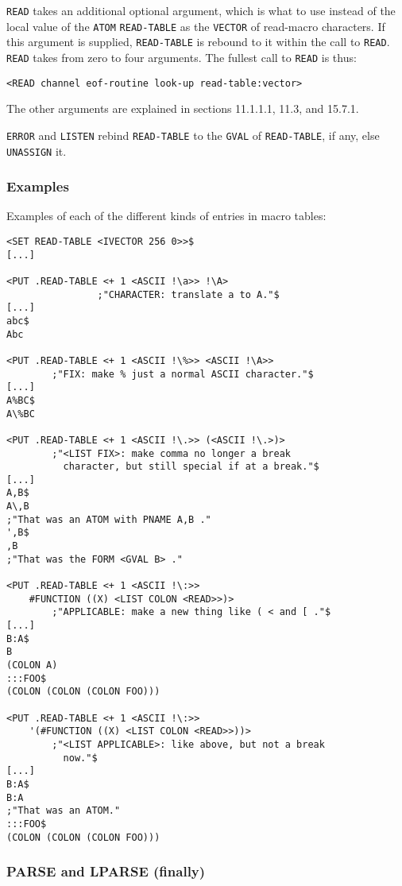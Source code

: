 \documentclass[a4paper]{scrbook}
\begin{document}
\texttt{READ} takes an additional optional argument, which is what to use instead of the local value of the \texttt{ATOM}
\texttt{READ-TABLE} as the \texttt{VECTOR} of read-macro characters. If this argument is supplied, \texttt{READ-TABLE} is
rebound to it within the call to \texttt{READ}. \texttt{READ} takes from zero to four arguments. The fullest call to
\texttt{READ} is thus:

\begin{verbatim}
<READ channel eof-routine look-up read-table:vector>
\end{verbatim}

The other arguments are explained in sections 11.1.1.1, 11.3, and 15.7.1.

\texttt{ERROR} and \texttt{LISTEN} rebind \texttt{READ-TABLE} to the \texttt{GVAL} of \texttt{READ-TABLE}, if any, else
\texttt{UNASSIGN} it.

\subsubsection{Examples}\label{examples-5}

Examples of each of the different kinds of entries in macro tables:

\begin{verbatim}
<SET READ-TABLE <IVECTOR 256 0>>$
[...]

<PUT .READ-TABLE <+ 1 <ASCII !\a>> !\A>
                ;"CHARACTER: translate a to A."$
[...]
abc$
Abc

<PUT .READ-TABLE <+ 1 <ASCII !\%>> <ASCII !\A>>
        ;"FIX: make % just a normal ASCII character."$
[...]
A%BC$
A\%BC

<PUT .READ-TABLE <+ 1 <ASCII !\.>> (<ASCII !\.>)>
        ;"<LIST FIX>: make comma no longer a break
          character, but still special if at a break."$
[...]
A,B$
A\,B
;"That was an ATOM with PNAME A,B ."
',B$
,B
;"That was the FORM <GVAL B> ."

<PUT .READ-TABLE <+ 1 <ASCII !\:>>
    #FUNCTION ((X) <LIST COLON <READ>>)>
        ;"APPLICABLE: make a new thing like ( < and [ ."$
[...]
B:A$
B
(COLON A)
:::FOO$
(COLON (COLON (COLON FOO)))

<PUT .READ-TABLE <+ 1 <ASCII !\:>>
    '(#FUNCTION ((X) <LIST COLON <READ>>))>
        ;"<LIST APPLICABLE>: like above, but not a break
          now."$
[...]
B:A$
B:A
;"That was an ATOM."
:::FOO$
(COLON (COLON (COLON FOO)))
\end{verbatim}

\subsubsection{PARSE and LPARSE (finally)}\label{parse-and-lparse-finally}
\end{document}

